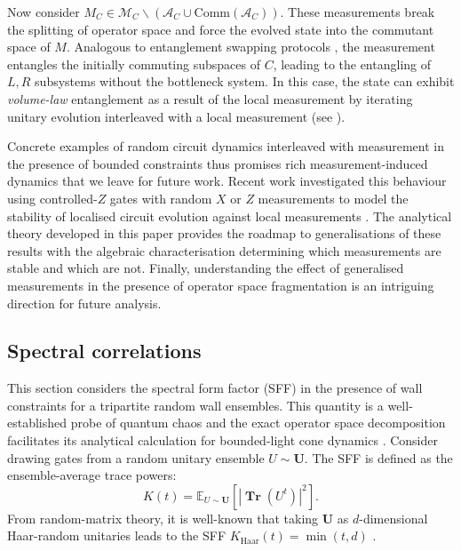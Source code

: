 \documentclass[11pt, twocolumn, floatfix, superscriptaddress, aps, prb, raggedbottom]{revtex4-2}
\newcommand{\comm}{\mathrm{Comm}}
\DeclareMathOperator{\tr}{\mathbf{Tr}}
\begin{document}
Now consider $M_C \in \mathcal{M}_C \backslash(\mathcal{A}_C \cup \comm(\mathcal{A}_C))$. These measurements break the splitting of operator space and force the evolved state into the commutant space of $M$. Analogous to entanglement swapping protocols \cite{ZukowskiZeilingerHorneEkert1993EntanglementSwapping, PanBouwmeesterWeinfurterZeilinger1998ExperimentalEntanglementSwapping}, the measurement entangles the initially commuting subspaces of $C$, leading to the entangling of $L, R$ subsystems without the bottleneck system. In this case, the state can exhibit \textit{volume-law} entanglement as a result of the local measurement by iterating unitary evolution interleaved with a local measurement (see ). 

Concrete examples of random circuit dynamics interleaved with measurement in the presence of bounded constraints thus promises rich measurement-induced dynamics that we leave for future work. Recent work investigated this behaviour using controlled-$Z$ gates with random $X$ or $Z$ measurements to model the stability of localised circuit evolution against local measurements \cite{IppolitiGullansGopalakrishnanHuseKhemani2021MeasurementOnly}. The analytical theory developed in this paper provides the roadmap to generalisations of these results with the algebraic characterisation determining which measurements are stable and which are not. Finally, understanding the effect of generalised measurements in the presence of operator space fragmentation is an intriguing direction for future analysis.
\subsection{Spectral correlations}

This section considers the spectral form factor (SFF) in the presence of wall constraints for a tripartite random wall ensembles. This quantity is a well-established probe of quantum chaos and the exact operator space decomposition facilitates its analytical calculation for bounded-light cone dynamics \cite{Brezin1997, Haake1999, Haake2010, Chan2018MBQC, Chan2018, Bertini2021}. Consider drawing gates from a random unitary ensemble $U \sim{\mathbf{U}}$. The SFF is defined as the ensemble-average trace powers:
\begin{equation}
K(t) = \mathds{E}_{U \sim \mathbf{U
}} \left [|\tr(U^t)| ^2\right]. 
\end{equation}
\noindent From random-matrix theory, it is well-known that taking $\mathbf{U}$ as $d$-dimensional Haar-random unitaries leads to the SFF $K_{\mathrm{Haar}}(t) = \min(t, d)$ \cite{Mehta2004, Haake2010}. 
\end{document}
